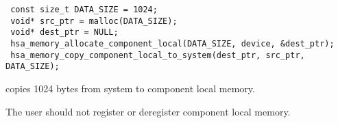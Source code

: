 \begin{framed}
\begin{lstlisting}
 const size_t DATA_SIZE = 1024;
 void* src_ptr = malloc(DATA_SIZE);
 void* dest_ptr = NULL;
 hsa_memory_allocate_component_local(DATA_SIZE, device, &dest_ptr);
 hsa_memory_copy_component_local_to_system(dest_ptr, src_ptr, DATA_SIZE);
\end{lstlisting}
\end{framed}

copies 1024 bytes from system to component local memory.

The user should not register or deregister component local memory. 

